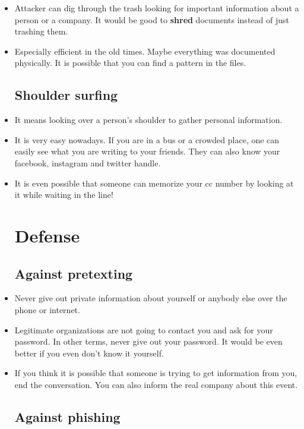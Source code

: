\documentclass[12pt]{article}
\begin{document}
\begin{itemize}[itemsep=3em]
	\item Attacker can dig through the trash looking for important information about a person or a company. It would be good to \textbf{shred} documents instead of just trashing them. 

	\item Especially efficient in the old times. Maybe everything was documented physically. It is possible that you can find a pattern in the files.
	
	\subsection{Shoulder surfing}

	\item It means looking over a person's shoulder to gather personal information. 
	
	\item It is very easy nowadays. If you are in a bus or a crowded place, one can easily see what you are writing to your friends. They can also know your facebook, instagram and twitter handle. 
	
	\item It is even possible that someone can memorize your cc number by looking at it while waiting in the line!
	
	
	\newpage
	\section{Defense}
	
	\subsection{Against pretexting}
	
	\item Never give out private information about yourself or anybody else over the phone or internet. 
	
	\item Legitimate organizations are not going to contact you and ask for your password. In other terms, never give out your password. It would be even better if you even don't know it yourself.
	
	\item If you think it is possible that someone is trying to get information from you, end the conversation. You can also inform the real company about this event.
	
	\subsection{Against phishing}
	

\end{itemize}
\end{document}
